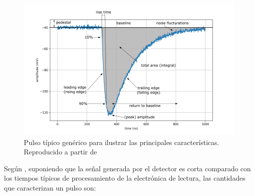 \documentclass[]{book}
\begin{document}
\begin{figure}[h]
    \centering
    \includegraphics[width=1.0\textwidth]{pulse_edited.png}
    \caption{Pulso típico genérico para ilustrar las principales características. Reproducido a partir de \cite{kolanoski2020particle}}
    \label{fig:pulse}

\end{figure}

\noindent Según \cite{knoll2010radiation}, suponiendo que la señal generada por el detector es corta comparado con los tiempos típicos de procesamiento de la electrónica de lectura, las cantidades que caracterizan un pulso son:
\end{document}
